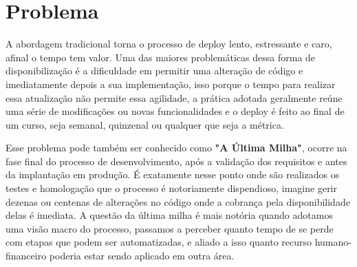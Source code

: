 \chapter{Problema}\label{cap:problema}

A abordagem tradicional torna o processo de deploy lento, estressante e caro, afinal o tempo tem valor. Uma das maiores problemáticas dessa forma de disponibilização é a dificuldade em permitir uma alteração de código e imediatamente depois a sua implementação, isso porque o tempo para realizar essa atualização não permite essa agilidade, a prática adotada geralmente reúne uma série de modificações ou novas funcionalidades e o deploy é feito ao final de um curso, seja semanal, quinzenal ou qualquer que seja a métrica.

Esse problema pode também ser conhecido como \textbf{"A Última Milha"}, ocorre na fase final do processo de desenvolvimento, após a validação dos requisitos e antes da implantação em produção. É exatamente nesse ponto onde são realizados os testes e homologação que o processo é notoriamente dispendioso, imagine gerir dezenas ou centenas de alterações no código onde a cobrança pela disponibilidade delas é imediata. A questão da última milha é mais notória quando adotamos uma visão macro do processo, passamos a perceber quanto tempo de se perde com etapas que podem ser automatizadas, e aliado a isso quanto recurso humano-financeiro poderia estar sendo aplicado em outra área. \cite{sato2014devops}